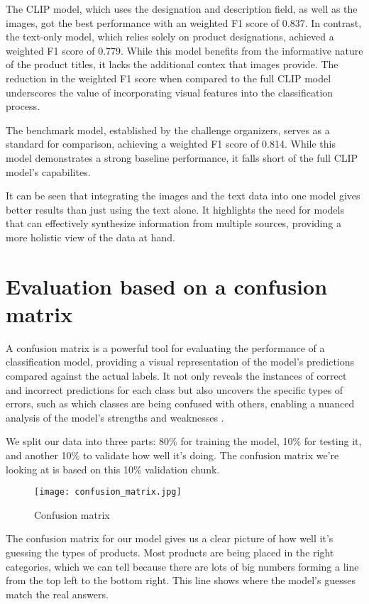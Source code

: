The CLIP model, which uses the designation and description field, as well as the images, got the best performance with an weighted F1 score of 0.837. In contrast, the text-only model, which relies solely on product designations, achieved a weighted F1 score of 0.779. While this model benefits from the informative nature of the product titles, it lacks the additional contex that images provide. The reduction in the weighted F1 score when compared to the full CLIP model underscores the value of incorporating visual features into the classification process.

The benchmark model, established by the challenge organizers, serves as a standard for comparison, achieving a weighted F1 score of 0.814. While this model demonstrates a strong baseline performance, it falls short of the full CLIP model's capabilites.

It can be seen that integrating the images and the text data into one model gives better results than just using the text alone. It highlights the need for models that can effectively synthesize information from multiple sources, providing a more holistic view of the data at hand.

\section{Evaluation based on a confusion matrix}

A confusion matrix is a powerful tool for evaluating the performance of a classification model, providing a visual representation of the model's predictions compared against the actual labels. It not only reveals the instances of correct and incorrect predictions for each class but also uncovers the specific types of errors, such as which classes are being confused with others, enabling a nuanced analysis of the model's strengths and weaknesses \cite{susmaga-2004}.

We split our data into three parts: 80\% for training the model, 10\% for testing it, and another 10\% to validate how well it's doing. The confusion matrix we're looking at is based on this 10\% validation chunk.

\begin{figure}[H]
	\centering
	\texttt{[image: confusion\_matrix.jpg]}
	\caption{Confusion matrix}
	\label{fig:confusionmatrix}
\end{figure}

The confusion matrix for our model gives us a clear picture of how well it's guessing the types of products. Most products are being placed in the right categories, which we can tell because there are lots of big numbers forming a line from the top left to the bottom right. This line shows where the model's guesses match the real answers.

